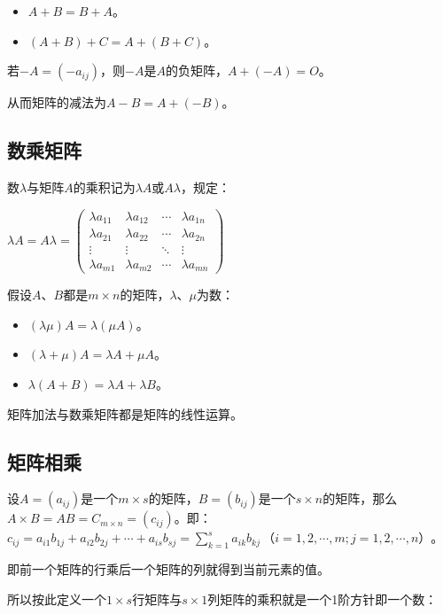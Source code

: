 \documentclass[UTF8, 12pt]{ctexart}
\begin{document}
\begin{itemize}
    \item $A+B=B+A$。
    \item $(A+B)+C=A+(B+C)$。
\end{itemize}

若$-A=(-a_{ij})$，则$-A$是$A$的负矩阵，$A+(-A)=O$。

从而矩阵的减法为$A-B=A+(-B)$。

\subsection{数乘矩阵}

数$\lambda$与矩阵$A$的乘积记为$\lambda A$或$A\lambda$，规定：\medskip

$\lambda A=A\lambda=\left(
    \begin{array}{cccc}
        \lambda a_{11} & \lambda a_{12} & \cdots & \lambda a_{1n} \\
        \lambda a_{21} & \lambda a_{22} & \cdots & \lambda a_{2n} \\
        \vdots & \vdots & \ddots & \vdots \\
        \lambda a_{m1} & \lambda a_{m2} & \cdots & \lambda a_{mn}
    \end{array}
\right)$ \medskip

假设$A$、$B$都是$m\times n$的矩阵，$\lambda$、$\mu$为数：

\begin{itemize}
    \item $(\lambda\mu)A=\lambda(\mu A)$。
    \item $(\lambda+\mu)A=\lambda A+\mu A$。
    \item $\lambda(A+B)=\lambda A+\lambda B$。
\end{itemize}

矩阵加法与数乘矩阵都是矩阵的线性运算。

\subsection{矩阵相乘}

设$A=(a_{ij})$是一个$m\times s$的矩阵，$B=(b_{ij})$是一个$s\times n$的矩阵，那么$A\times B=AB=C_{m\times n}=(c_{ij})$。即：$c_{ij}=a_{i1}b_{1j}+a_{i2}b_{2j}+\cdots+a_{is}b_{sj}=\sum\limits_{k=1}^sa_{ik}b_{kj}\,\text{（}i=1,2,\cdots,m;j=1,2,\cdots,n\text{）}$。

即前一个矩阵的行乘后一个矩阵的列就得到当前元素的值。

所以按此定义一个$1\times s$行矩阵与$s\times 1$列矩阵的乘积就是一个1阶方针即一个数：
\end{document}
